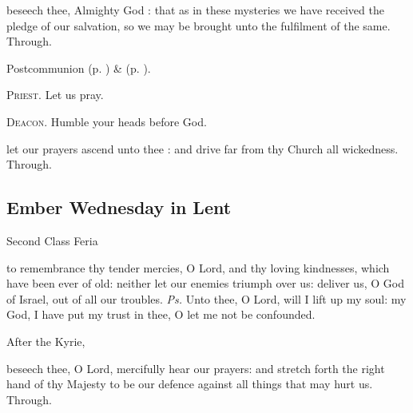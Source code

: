 \vspace{-0.25\baselineskip}

\postcommunion

\vspace{-0.1\baselineskip}

 beseech thee, Almighty God : that as in these mysteries we have received the pledge of our salvation, so we may be brought unto the fulfilment of the same. Through.

\begin{rubric}
     Postcommunion  (p. \pageref{AshWednesdayMassPostcommunion}) \&   (p. \pageref{SPLivingDeparted}).
\end{rubric}

\textsc{Priest.} Let us pray.\par
\textsc{Deacon.} Humble your heads before God.\par
{} let our prayers ascend unto thee : and drive far from thy Church all wickedness. Through.



\subsection{Ember Wednesday in Lent}
\begin{inhead}
{Second Class Feria}
\end{inhead}


\introit
{} to remembrance thy tender mercies, O Lord, and thy loving kindnesses, which have been ever of old: neither let our enemies triumph over us: deliver us, O God of Israel, out of all our troubles. \textit{Ps.} Unto thee, O Lord, will I lift up my soul: my God, I have put my trust in thee, O let me not be confounded.

\begin{rubric}
    After the Kyrie,
\end{rubric}

\collect
{} beseech thee, O Lord, mercifully hear our prayers: and stretch forth the right hand of thy Majesty to be our defence against all things that may hurt us. Through.

